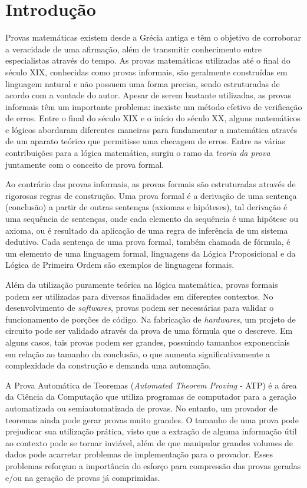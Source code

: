 
\chapter{Introdução}

Provas matemáticas existem desde a Grécia antiga e têm o objetivo de corroborar a veracidade de uma afirmação, além de transmitir conhecimento entre especialistas através do tempo. As provas matemáticas utilizadas até o final do século XIX, conhecidas como provas informais, são geralmente construídas em linguagem natural e não possuem uma forma precisa, sendo estruturadas de acordo com a vontade do autor. Apesar de serem bastante utilizadas, as provas informais têm um importante problema: inexiste um método efetivo de verificação de erros. Entre o final do século XIX e o início do século XX, alguns matemáticos e lógicos abordaram diferentes maneiras para fundamentar a matemática através de um aparato teórico que permitisse uma checagem de erros. Entre as várias contribuições para a lógica matemática, surgiu o ramo da \textit{teoria da prova} juntamente com o conceito de prova formal.

Ao contrário das provas informais, as provas formais são estruturadas através de rigorosas regras de construção. Uma prova formal é a derivação de uma sentença (conclusão) a partir de outras sentenças (axiomas e hipóteses), tal derivação é uma sequência de sentenças, onde cada elemento da sequência é uma hipótese ou axioma, ou é resultado da aplicação de uma regra de inferência de um sistema dedutivo. Cada sentença de uma prova formal, também chamada de fórmula, é um elemento de uma linguagem formal, linguagens da Lógica Proposicional e da Lógica de Primeira Ordem são exemplos de linguagens formais.

Além da utilização puramente teórica na lógica matemática, provas formais podem ser utilizadas para diversas finalidades em diferentes contextos. No desenvolvimento de \textit{softwares}, provas podem ser necessárias para validar o funcionamento de porções de código. Na fabricação de \textit{hardwares}, um projeto de circuito pode ser validado através da prova de uma fórmula que o descreve. Em alguns casos, tais provas podem ser grandes, possuindo tamanhos exponenciais em relação ao tamanho da conclusão, o que aumenta significativamente a complexidade da construção e demanda uma automação.

A Prova Automática de Teoremas (\textit{Automated Theorem Proving} - ATP) é a área da Ciência da Computação que utiliza programas de computador para a geração automatizada ou semiautomatizada de provas. No entanto, um provador de teoremas ainda pode gerar provas muito grandes. O tamanho de uma prova pode prejudicar sua utilização prática, visto que a extração de alguma informação útil ao contexto pode se tornar inviável, além de que manipular grandes volumes de dados pode acarretar problemas de implementação para o provador. Esses problemas reforçam a importância do esforço para compressão das provas geradas e/ou na geração de provas já comprimidas.

